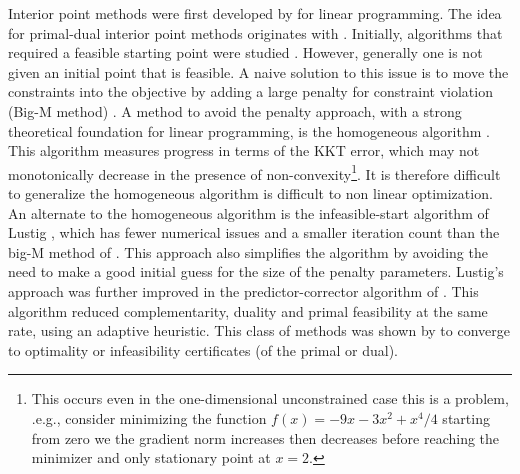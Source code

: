 \documentclass{article}
\begin{document}
Interior point methods were first developed by \citeauthor*{karmarkar1984new} for linear programming. The idea for primal-dual interior point methods originates with \citeauthor*{megiddo1989pathways}. Initially, algorithms that required a feasible starting point were studied \cite{kojima1989primal,monteiro1989interior}. However, generally one is not given an initial point that is feasible. A naive solution to this issue is to move the constraints into the objective  by adding a large penalty for constraint violation (Big-M method) \cite{mcshane1989implementation}. A method to avoid the penalty approach, with a strong theoretical foundation for linear programming, is the homogeneous algorithm \cite{ye1994nl,andersen1999homogeneous,andersen1998computational}. This algorithm measures progress in terms of the KKT error, which may not monotonically decrease in the presence of non-convexity\footnote{This occurs even in the one-dimensional unconstrained case this is a problem, .e.g., consider minimizing the function $f(x)=-9 x - 3 x^2 + x^4/4$ starting from zero we the gradient norm increases then decreases before reaching the minimizer and only stationary point at $x = 2$.}. It is therefore difficult to generalize the homogeneous algorithm is difficult to non linear optimization. An alternate to the homogeneous algorithm is the infeasible-start algorithm of Lustig \cite{lustig1990feasibility}, which has fewer numerical issues and a smaller iteration count than the big-M method of \cite{mcshane1989implementation}. This approach also simplifies the algorithm by avoiding the need to make a good initial guess for the size of the penalty parameters. Lustig's approach was further improved in the predictor-corrector algorithm of \cite{mehrotra1992implementation}. This algorithm reduced complementarity, duality and primal feasibility at the same rate, using an adaptive heuristic. This class of methods was shown by \cite{todd2003detecting} to converge to optimality or infeasibility certificates (of the primal or dual). 


\end{document}
